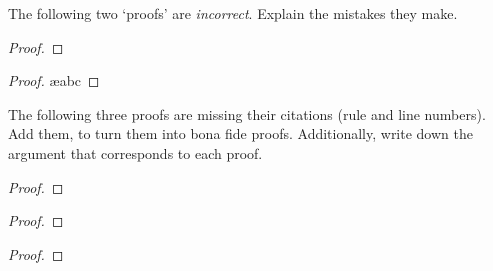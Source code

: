 \practiceproblems

\problempart
The following two `proofs' are \emph{incorrect}. Explain the mistakes they make.
\begin{multicols}{2}
\begin{proof}
\open
\close
\open
\close
{}
\end{proof}

\begin{proof}
\ae{abc}
\end{proof}
\end{multicols}
\problempart
The following three proofs are missing their citations (rule and line numbers). Add them, to turn them into bona fide proofs. Additionally, write down the argument that corresponds to each proof.
\begin{multicols}{2}
\begin{proof}
\end{proof}

\begin{proof}
\open
\close
{}%
\end{proof}

\begin{proof}
\open
\close
\open
\close
{}%
\end{proof}
\end{multicols}

